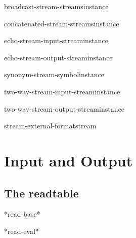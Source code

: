 \documentclass[10pt,english]{book}
\begin{document}
\begin{function}{broadcast-stream-streams}{instance}
  
\end{function}

\begin{function}{concatenated-stream-streams}{instance}
  
\end{function}

\begin{function}{echo-stream-input-stream}{instance}
  
\end{function}

\begin{function}{echo-stream-output-stream}{instance}
  
\end{function}

\begin{function}{synonym-stream-symbol}{instance}
  
\end{function}

\begin{function}{two-way-stream-input-stream}{instance}
  
\end{function}

\begin{function}{two-way-stream-output-stream}{instance}
  
\end{function}

\begin{function}{stream-external-format}{stream}
  
\end{function}


\chapter{Input and Output}
\label{cha:input-output}

\section{The readtable}
\label{sec:readtable}

\begin{variable}{*read-base*}{}
  
\end{variable}

\begin{variable}{*read-eval*}{}
  
\end{variable}
\end{document}
